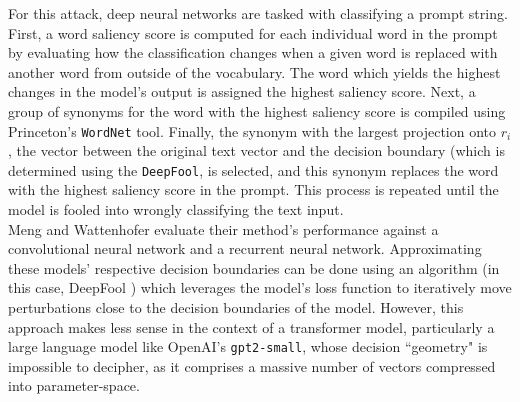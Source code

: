 \documentclass{article}
\begin{document}
For this attack, deep neural networks are tasked with classifying a prompt string. First, a word saliency score is computed for each individual word in the prompt by evaluating how the classification changes when a given word is replaced with another word from outside of the vocabulary. The word which yields the highest changes in the model's output is assigned the highest saliency score. Next, a group of synonyms for the word with the highest saliency score is compiled using Princeton's \texttt{WordNet} tool. Finally, the synonym with the largest projection onto $r_i$, the vector between the original text vector and the decision boundary (which is determined using the \texttt{DeepFool}, is selected, and this synonym replaces the word with the highest saliency score in the prompt. This process is repeated until the model is fooled into wrongly classifying the text input. \\ 


Meng and Wattenhofer evaluate their method's performance against a convolutional neural network and a recurrent neural network. Approximating these models' respective decision boundaries can be done using an algorithm (in this case, DeepFool \citep{deepfool}) which leverages the model's loss function to iteratively move perturbations close to the decision boundaries of the model. However, this approach makes less sense in the context of a transformer model, particularly a large language model like OpenAI's \texttt{gpt2-small}, whose decision ``geometry" is impossible to decipher, as it comprises a massive number of vectors compressed into parameter-space.\\ 
\end{document}
